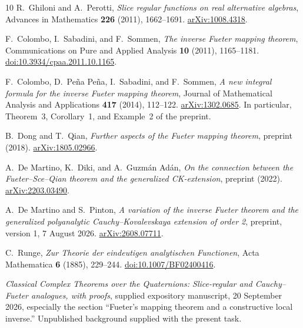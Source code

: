\documentclass[11pt,a4paper]{article}
\numberwithin{equation}{section}
\theoremstyle{definition}
\theoremstyle{remark}
\begin{document}
\clearpage
{}
{}
\begin{thebibliography}{10}
R.~Ghiloni and A.~Perotti,
\emph{Slice regular functions on real alternative algebras},
Advances in Mathematics \textbf{226} (2011), 1662--1691.
\href{https://arxiv.org/abs/1008.4318}{arXiv:1008.4318}.

F.~Colombo, I.~Sabadini, and F.~Sommen,
\emph{The inverse Fueter mapping theorem},
Communications on Pure and Applied Analysis \textbf{10} (2011), 1165--1181.
\href{https://doi.org/10.3934/cpaa.2011.10.1165}{doi:10.3934/cpaa.2011.10.1165}.

F.~Colombo, D.~Pe\~na Pe\~na, I.~Sabadini, and F.~Sommen,
\emph{A new integral formula for the inverse Fueter mapping theorem},
Journal of Mathematical Analysis and Applications \textbf{417} (2014), 112--122.
\href{https://arxiv.org/abs/1302.0685}{arXiv:1302.0685}.
In particular, Theorem~3, Corollary~1, and Example~2 of the preprint.

B.~Dong and T.~Qian,
\emph{Further aspects of the Fueter mapping theorem},
preprint (2018).
\href{https://arxiv.org/abs/1805.02966}{arXiv:1805.02966}.

A.~De Martino, K.~Diki, and A.~Guzm\'an Ad\'an,
\emph{On the connection between the Fueter--Sce--Qian theorem and the
 generalized CK-extension}, preprint (2022).
\href{https://arxiv.org/abs/2203.03490}{arXiv:2203.03490}.

A.~De Martino and S.~Pinton,
\emph{A variation of the inverse Fueter theorem and the generalized
 polyanalytic Cauchy--Kovalevskaya extension of order 2},
preprint, version 1, 7 August 2026.
\href{https://arxiv.org/abs/2608.07711}{arXiv:2608.07711}.

C.~Runge,
\emph{Zur Theorie der eindeutigen analytischen Functionen},
Acta Mathematica \textbf{6} (1885), 229--244.
\href{https://doi.org/10.1007/BF02400416}{doi:10.1007/BF02400416}.

\emph{Classical Complex Theorems over the Quaternions:
 Slice-regular and Cauchy--Fueter analogues, with proofs},
supplied expository manuscript, 20 September 2026,
especially the section
``Fueter's mapping theorem and a constructive local inverse.''
Unpublished background supplied with the present task.
\end{thebibliography}
\end{document}
